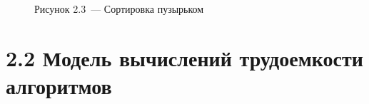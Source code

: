 \documentclass[12pt, a4paper]{report}
\begin{document}
\begin{figure}[H]
\caption*{Рисунок 2.3~--- Сортировка пузырьком}
\end{figure}

\section*{2.2 Модель вычислений трудоемкости алгоритмов}
\end{document}
